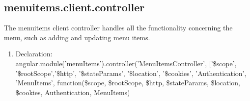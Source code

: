 \documentclass[a4paper,12pt]{report}
\begin{document}
\subsection{menuitems.client.controller}
The menuitems client controller handles all the functionality concerning the menu, such as adding and updating menu items.
\begin{enumerate}
\item Declaration: \\angular.module('menuItems').controller('MenuItemsController', ['\$scope', '\$rootScope','\$http', '\$stateParams', '\$location', '\$cookies', 'Authentication', 'MenuItems',
	function(\$scope, \$rootScope, \$http, \$stateParams, \$location, \$cookies, Authentication, MenuItems)
	

\end{enumerate}
\end{document}
